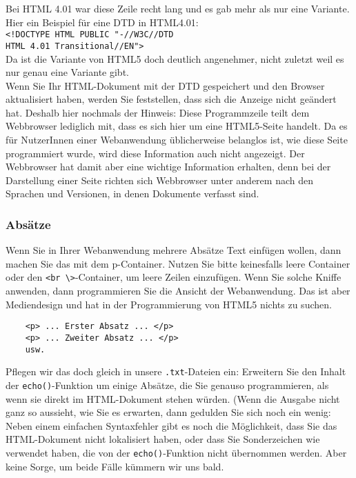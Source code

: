 Bei HTML 4.01 war diese Zeile recht lang und es gab mehr als nur eine Variante. Hier ein Beispiel für eine DTD in HTML4.01:\\

\verb|<!DOCTYPE HTML PUBLIC "-//W3C//DTD|\\\verb|HTML 4.01 Transitional//EN">|\\

Da ist die Variante von HTML5 doch deutlich angenehmer, nicht zuletzt weil es nur genau eine Variante gibt.\\

Wenn Sie Ihr HTML-Dokument mit der DTD gespeichert und den Browser aktualisiert haben, werden Sie feststellen, dass sich die Anzeige nicht geändert hat. Deshalb hier nochmals der Hinweis: Diese Programmzeile teilt dem Webbrowser lediglich mit, dass es sich hier um eine HTML5-Seite handelt. Da es für NutzerInnen einer Webanwendung üblicherweise belanglos ist, wie diese Seite programmiert wurde, wird diese Information auch nicht angezeigt. Der Webbrowser hat damit aber eine wichtige Information erhalten, denn bei der Darstellung einer Seite richten sich Webbrowser unter anderem nach den Sprachen und Versionen, in denen Dokumente verfasst sind.

\subsubsection{Absätze}

Wenn Sie in Ihrer Webanwendung mehrere Absätze Text einfügen wollen, dann machen Sie das mit dem p-Container. Nutzen Sie bitte keinesfalls leere Container oder den \verb|<br \>|-Container, um leere Zeilen einzufügen. Wenn Sie solche Kniffe anwenden, dann programmieren Sie die Ansicht der Webanwendung. Das ist aber Mediendesign und hat in der Programmierung von HTML5 nichts zu suchen.

\begin{verbatim}
	<p> ... Erster Absatz ... </p>
	<p> ... Zweiter Absatz ... </p>
	usw.
\end{verbatim}

Pflegen wir das doch gleich in unsere \verb|.txt|-Dateien ein: Erweitern Sie den Inhalt der \verb|echo()|-Funktion um einige Absätze, die Sie genauso programmieren, als wenn sie direkt im HTML-Dokument stehen würden. (Wenn die Ausgabe nicht ganz so aussieht, wie Sie es erwarten, dann gedulden Sie sich noch ein wenig: Neben einem einfachen Syntaxfehler gibt es noch die Möglichkeit, dass Sie das HTML-Dokument nicht lokalisiert haben, oder dass Sie Sonderzeichen wie \grqq{} verwendet haben, die von der \verb|echo()|-Funktion nicht übernommen werden. Aber keine Sorge, um beide Fälle kümmern wir uns bald.


